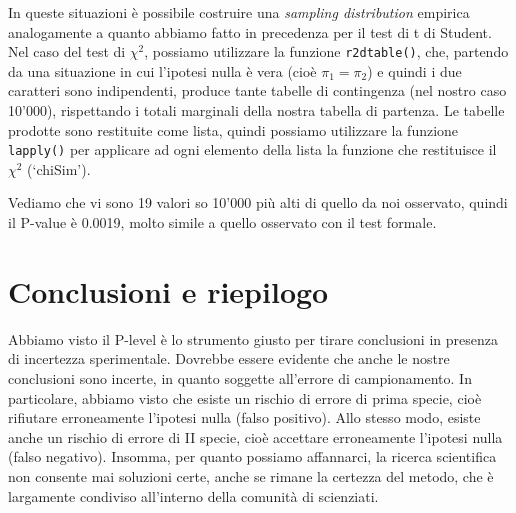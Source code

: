 \documentclass[a4paper,12pt,oneside]{book}
\newenvironment{Shaded}{\begin{snugshade}}{\end{snugshade}}
\newcommand{\DecValTok}[1]{#1}
\newcommand{\FloatTok}[1]{#1}
\newcommand{\SpecialCharTok}[1]{#1}
\newcommand{\DocumentationTok}[1]{#1}
\newcommand{\OtherTok}[1]{#1}
\newcommand{\FunctionTok}[1]{#1}
\newcommand{\ControlFlowTok}[1]{#1}
\newcommand{\NormalTok}[1]{#1}
\begin{document}
In queste situazioni è possibile costruire una \emph{sampling distribution} empirica analogamente a quanto abbiamo fatto in precedenza per il test di t di Student. Nel caso del test di \(\chi^2\), possiamo utilizzare la funzione \texttt{r2dtable()}, che, partendo da una situazione in cui l'ipotesi nulla è vera (cioè \(\pi_1 = \pi_2\)) e quindi i due caratteri sono indipendenti, produce tante tabelle di contingenza (nel nostro caso 10'000), rispettando i totali marginali della nostra tabella di partenza. Le tabelle prodotte sono restituite come lista, quindi possiamo utilizzare la funzione \texttt{lapply()} per applicare ad ogni elemento della lista la funzione che restituisce il \(\chi^2\) (`chiSim').

\begin{Shaded}
\end{Shaded}

Vediamo che vi sono 19 valori so 10'000 più alti di quello da noi osservato, quindi il P-value è 0.0019, molto simile a quello osservato con il test formale.

\hypertarget{conclusioni-e-riepilogo}{%
\section{Conclusioni e riepilogo}\label{conclusioni-e-riepilogo}}

Abbiamo visto il P-level è lo strumento giusto per tirare conclusioni in presenza di incertezza sperimentale. Dovrebbe essere evidente che anche le nostre conclusioni sono incerte, in quanto soggette all'errore di campionamento. In particolare, abbiamo visto che esiste un rischio di errore di prima specie, cioè rifiutare erroneamente l'ipotesi nulla (falso positivo). Allo stesso modo, esiste anche un rischio di errore di II specie, cioè accettare erroneamente l'ipotesi nulla (falso negativo). Insomma, per quanto possiamo affannarci, la ricerca scientifica non consente mai soluzioni certe, anche se rimane la certezza del metodo, che è largamente condiviso all'interno della comunità di scienziati.
\end{document}
